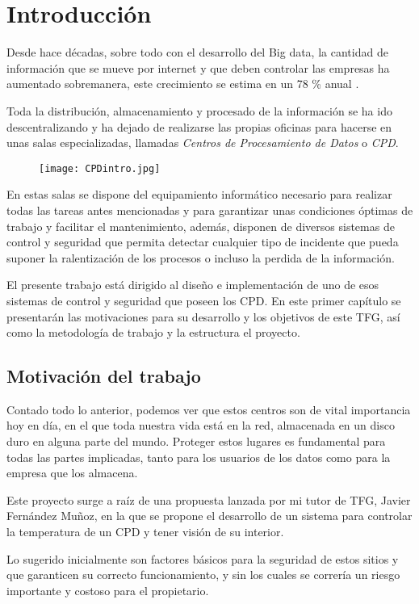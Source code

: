 \chapter{Introducción}
\label{ch:introduccion}
Desde hace décadas, sobre todo con el desarrollo del Big data, la cantidad de información que se mueve por internet y que deben controlar las empresas ha aumentado sobremanera, este crecimiento se estima en un 78 \% anual \cite{monleon-getino_impacto_2015}.

Toda la distribución, almacenamiento y procesado de la información se ha ido descentralizando y ha dejado de realizarse las propias oficinas para hacerse en unas salas especializadas, llamadas \textit{Centros de Procesamiento de Datos} o \textit{CPD}. 
\begin{figure}[H]
	{\texttt{[image: CPDintro.jpg]}}
\end{figure}
En estas salas se dispone del equipamiento informático necesario para realizar todas las tareas antes mencionadas y para garantizar unas condiciones óptimas de trabajo y facilitar el mantenimiento, además, disponen de diversos sistemas de control y seguridad que permita detectar cualquier tipo de incidente que pueda suponer la ralentización de los procesos o incluso la perdida de la información.

El presente trabajo está dirigido al diseño e implementación de uno de esos sistemas de control y seguridad que poseen los CPD. En este primer capítulo se presentarán las motivaciones para su desarrollo y los objetivos de este TFG, así como la metodología de trabajo y la estructura el proyecto.

\section{Motivación del trabajo}
Contado todo lo anterior, podemos ver que estos centros son de vital importancia hoy en día, en el que toda nuestra vida está en la red, almacenada en un disco duro en alguna parte del mundo. Proteger estos lugares es fundamental para todas las partes implicadas, tanto para los usuarios de los datos como para la empresa que los almacena.

Este proyecto surge a raíz de una propuesta lanzada por mi tutor de TFG, Javier Fernández Muñoz, en la que se propone el desarrollo de un sistema para controlar la temperatura de un CPD y tener visión de su interior. 

Lo sugerido inicialmente son factores básicos para la seguridad de estos sitios y que garanticen su correcto funcionamiento, y sin los cuales se correría un riesgo importante y costoso para el propietario.

